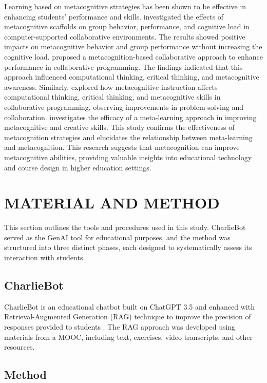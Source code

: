 \documentclass[a4paper,twoside]{article}
\begin{document}
Learning based on metacognitive strategies has been shown to be effective in
enhancing students’ performance and skills. \cite{Zheng19} investigated the
effects of metacognitive scaffolds on group behavior, performance, and cognitive
load in computer-supported collaborative environments. The results showed
positive impacts on metacognitive behavior and group performance without
increasing the cognitive load. \cite{LiWei23} proposed a metacognition-based
collaborative approach to enhance performance in collaborative programming. The
findings indicated that this approach influenced computational thinking,
critical thinking, and metacognitive awareness. Similarly, \cite{Wang23}
explored how metacognitive instruction affects computational thinking, critical
thinking, and metacognitive skills in collaborative programming, observing
improvements in problem-solving and collaboration. \cite{Khusnul24} investigates
the efficacy of a meta-learning approach in improving metacognitive and creative
skills. This study confirms the effectiveness of metacognition strategies and
elucidates the relationship between meta-learning and metacognition. This
research suggests that metacognition can improve metacognitive abilities,
providing valuable insights into educational technology and course design in
higher education settings.

\section{\uppercase{Material and Method}}

This section outlines the tools and procedures used in this study. CharlieBot
served as the GenAI tool for educational purposes, and the method was structured
into three distinct phases, each designed to systematically assess its
interaction with students.

\subsection{CharlieBot}

CharlieBot is an educational chatbot built on ChatGPT 3.5 and enhanced with
Retrieval-Augmented Generation (RAG) technique to improve the precision of
responses provided to students \citep{Sun24}. The RAG approach was developed
using materials from a MOOC, including text, exercises, video transcripts, and
other resources.

\subsection{Method}
\end{document}
